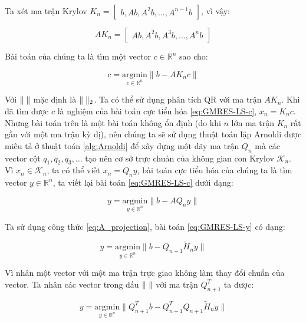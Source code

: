 \documentclass[14pt, a4paper]{article}
\numberwithin{equation}{section}
\numberwithin{algorithm}{section}
\numberwithin{figure}{section}
\numberwithin{dl}{section}
\numberwithin{md}{section}
\numberwithin{bd}{section}
\numberwithin{dn}{section}
\begin{document}
Ta xét ma trận Krylov $K_n = \begin{bmatrix} b, Ab, A^2b, \dots, A^{n-1}b \end{bmatrix}$, vì vậy:

\begin{equation}
    A K_n = \begin{bmatrix} Ab, A^2b, A^3b, \dots, A^nb \end{bmatrix}
\end{equation}

Bài toán của chúng ta là tìm một vector $c \in \mathbb{R}^n$ sao cho:

\begin{equation} \label{eq:GMRES-LS-c}
    c = \underset{c \in \mathbb{R}^{n}}{\mathrm{argmin}} \lVert b - AK_n c \rVert
\end{equation}

Với $\lVert \thickspace \rVert$ mặc định là $\lVert \thickspace \rVert_2$. Ta có thể sử dụng phân tích QR với ma trận $AK_n$. Khi đã tìm được $c$ là nghiệm của bài toán cực tiểu hóa \ref{eq:GMRES-LS-c}, $x_n=K_n c$. Nhưng bài toán trên là một bài toán không ổn định (do khi $n$ lớn ma trận $K_n$ rất gần với một ma trận kỳ dị), nên chúng ta sẽ sử dụng thuật toán lặp Arnoldi được miêu tả ở thuật toán \ref{alg:Arnoldi}
để xây dựng một dãy ma trận $Q_n$ mà các vector cột $q_1, q_2, q_3, \dots$ tạo nên cơ sở trực chuản của không gian con Krylov $\mathcal{K}_n$. Vì $x_n \in \mathcal{K}_n$, ta có thể viết $x_n = Q_n y$, bài toán cực tiểu hóa của chúng ta là tìm vector $y \in \mathbb{R}^n$, ta viết lại bài toán \ref{eq:GMRES-LS-c} dưới dạng:

\begin{equation} \label{eq:GMRES-LS-y}
    y = \underset{y \in \mathbb{R}^{n}}{\mathrm{argmin}} \lVert b - A Q_n y \rVert
\end{equation}

Ta sử dụng công thức \ref{eq:A_projection}, bài toán \ref{eq:GMRES-LS-y} có dạng:

\begin{equation}
    y = \underset{y \in \mathbb{R}^{n}}{\mathrm{argmin}} \lVert b - Q_{n+1} \widetilde{H}_n y \rVert
\end{equation}

Vì nhân một vector với một ma trận trực giao không làm thay đổi chuẩn của vector. Ta nhân các vector trong dấu $\lVert \thickspace \rVert$ với ma trận $Q_{n+1}^T$ ta được:

\begin{equation}
    y = \underset{y \in \mathbb{R}^{n}}{\mathrm{argmin}} \lVert Q_{n+1}^T b - Q_{n+1}^T Q_{n+1} \widetilde{H}_n y \rVert
\end{equation}
\end{document}
